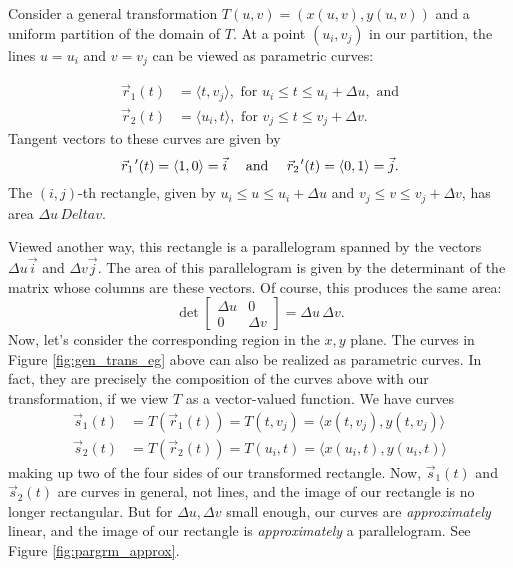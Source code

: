 Consider a general transformation $T(u,v) = (x(u,v),y(u,v))$ and a uniform partition of the domain of $T$. At a point $(u_i,v_j)$ in our partition, the lines $u=u_i$ and $v=v_j$ can be viewed as parametric curves:

\begin{align*}
\vec{r}_1(t) &= \langle t,v_j\rangle, \text{ for } u_i\leq t\leq u_i+\Delta u, \text{ and}\\
\vec{r}_2(t) &= \langle u_i,t\rangle, \text{ for } v_j\leq t\leq v_j+\Delta v.
\end{align*}
Tangent vectors to these curves are given by
\[
\vec{r}_1\hskip.75pt '(t) = \langle 1,0\rangle = \vec{i} \quad \text{ and } \quad \vec{r}_2\hskip.75pt '(t) = \langle 0,1\rangle = \vec{j}.
\]
The $(i,j)$-th rectangle, given by $u_i\leq u\leq u_i+\Delta u$ and $v_j\leq v\leq v_j+\Delta v$, has area $\Delta u \,Delta v$. 

Viewed another way, this rectangle is a parallelogram spanned by the vectors $\Delta u\vec{i}$ and $\Delta v\vec{j}$. The area of this parallelogram is given by the determinant of the matrix whose columns are these vectors. Of course, this produces the same area:
\[
\det\begin{bmatrix}\Delta u & 0\\0&\Delta v\end{bmatrix} = \Delta u\,\Delta v.
\]
Now, let's consider the corresponding region in the $x,y$ plane. The curves in Figure \ref{fig:gen_trans_eg} above can also be realized as parametric curves. In fact, they are precisely the composition of the curves above with our transformation, if we view $T$ as a vector-valued function. We have curves
\begin{align*}
\vec{s}_1(t) &= T(\vec{r}_1(t))=T(t,v_j) = \langle x(t,v_j),y(t,v_j)\rangle\\
\vec{s}_2(t) &= T(\vec{r}_2(t))=T(u_i,t) = \langle x(u_i,t),y(u_i,t)\rangle
\end{align*}
making up two of the four sides of our transformed rectangle. Now, $\vec{s}_1(t)$ and $\vec{s}_2(t)$ are curves in general, not lines, and the image of our rectangle is no longer rectangular. But for $\Delta u,\Delta v$ small enough, our curves are \emph{approximately} linear, and the image of our rectangle is \emph{approximately} a parallelogram. See Figure \ref{fig:pargrm_approx}.

